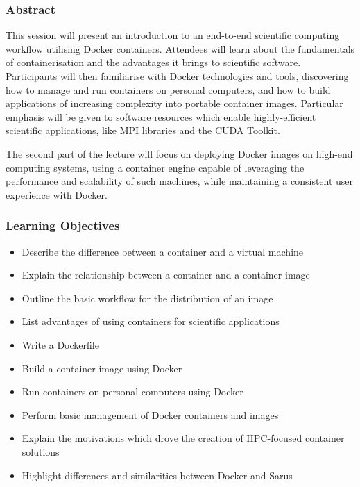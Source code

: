 \subsubsection{Abstract}

This session will present an introduction to an end-to-end scientific computing workflow utilising Docker containers. Attendees will learn about the fundamentals of containerisation and the advantages it brings to scientific software. Participants will then familiarise with Docker technologies and tools, discovering how to manage and run containers on personal computers, and how to build applications of increasing complexity into portable container images. Particular emphasis will be given to software resources which enable highly-efficient scientific applications, like MPI libraries and the CUDA Toolkit.

The second part of the lecture will focus on deploying Docker images on high-end computing systems, using a container engine capable of leveraging the performance and scalability of such machines, while maintaining a consistent user experience with Docker.

\subsubsection{Learning Objectives}

\begin{itemize}

\item Describe the difference between a container and a virtual machine
\item Explain the relationship between a container and a container image
\item Outline the basic workflow for the distribution of an image
\item List advantages of using containers for scientific applications
\item Write a Dockerfile
\item Build a container image using Docker
\item Run containers on personal computers using Docker
\item Perform basic management of Docker containers and images
\item Explain the motivations which drove the creation of HPC-focused container solutions
\item Highlight differences and similarities between Docker and Sarus

\end{itemize}


